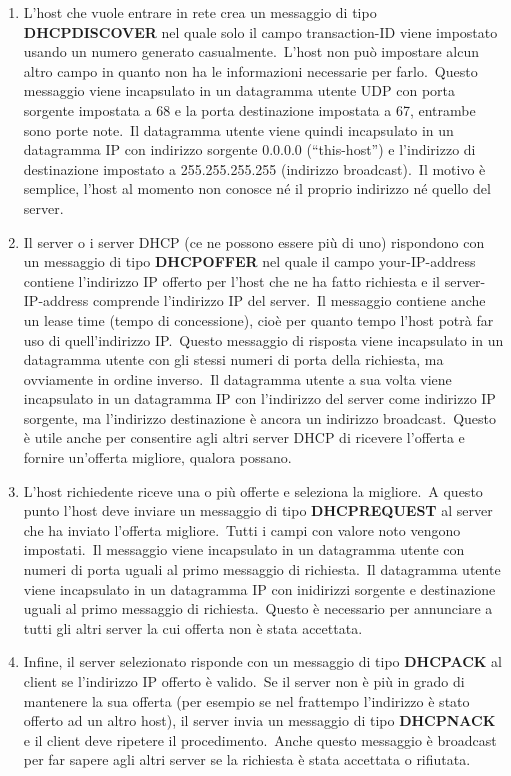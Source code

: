 \begin{enumerate}
    \item L'host che vuole entrare in rete crea un messaggio di tipo \textbf{DHCPDISCOVER} nel quale solo il campo transaction-ID viene impostato usando un numero generato casualmente.\
          L'host non può impostare alcun altro campo in quanto non ha le informazioni necessarie per farlo.\
          Questo messaggio viene incapsulato in un datagramma utente UDP con porta sorgente impostata a 68 e la porta destinazione impostata a 67, entrambe sono porte note.\
          Il datagramma utente viene quindi incapsulato in un datagramma IP con indirizzo sorgente 0.0.0.0 (``this-host'') e l'indirizzo di destinazione impostato a 255.255.255.255 (indirizzo broadcast).\
          Il motivo è semplice, l'host al momento non conosce né il proprio indirizzo né quello del server.
    \item Il server o i server DHCP (ce ne possono essere più di uno) rispondono con un messaggio di tipo \textbf{DHCPOFFER} nel quale il campo your-IP-address contiene l'indirizzo IP offerto per l'host che ne ha fatto richiesta e il server-IP-address comprende l'indirizzo IP del server.\
          Il messaggio contiene anche un lease time (tempo di concessione), cioè per quanto tempo l'host potrà far uso di quell'indirizzo IP.\
          Questo messaggio di risposta viene incapsulato in un datagramma utente con gli stessi numeri di porta della richiesta, ma ovviamente in ordine inverso.\
          Il datagramma utente a sua volta viene incapsulato in un datagramma IP con l'indirizzo del server come indirizzo IP sorgente, ma l'indirizzo destinazione è ancora un indirizzo broadcast.\
          Questo è utile anche per consentire agli altri server DHCP di ricevere l'offerta e fornire un'offerta migliore, qualora possano.
    \item L'host richiedente riceve una o più offerte e seleziona la migliore.\
          A questo punto l'host deve inviare un messaggio di tipo \textbf{DHCPREQUEST} al server che ha inviato l'offerta migliore.\
          Tutti i campi con valore noto vengono impostati.\
          Il messaggio viene incapsulato in un datagramma utente con numeri di porta uguali al primo messaggio di richiesta.\
          Il datagramma utente viene incapsulato in un datagramma IP con inidirizzi sorgente e destinazione uguali al primo messaggio di richiesta.\
          Questo è necessario per annunciare a tutti gli altri server la cui offerta non è stata accettata.
    \item Infine, il server selezionato risponde con un messaggio di tipo \textbf{DHCPACK} al client se l'indirizzo IP offerto è valido.\
          Se il server non è più in grado di mantenere la sua offerta (per esempio se nel frattempo l'indirizzo è stato offerto ad un altro host), il server invia un messaggio di tipo \textbf{DHCPNACK} e il client deve ripetere il procedimento.\
          Anche questo messaggio è broadcast per far sapere agli altri server se la richiesta è stata accettata o rifiutata.
\end{enumerate}

